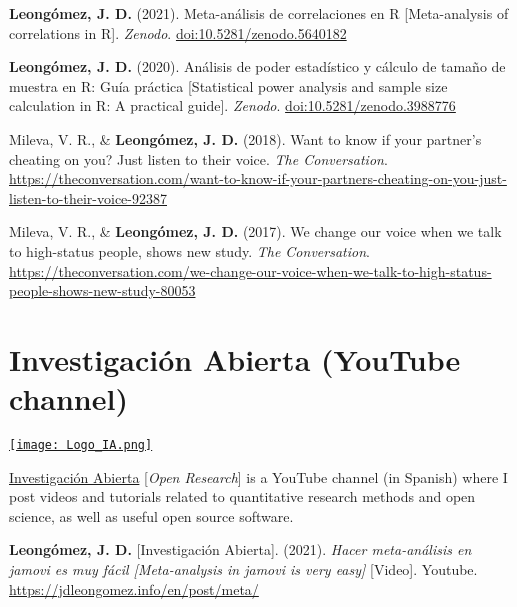 \documentclass[11pt,a4paper,]{awesome-cv}
\begin{document}
\begingroup
\setlength{\parindent}{-0.5in}
\setlength{\leftskip}{0.5in}

\textbf{Leongómez, J. D.} (2021). Meta-análisis de correlaciones en R
{[}Meta-analysis of correlations in R{]}. \emph{Zenodo}.
\url{doi:10.5281/zenodo.5640182}

\textbf{Leongómez, J. D.} (2020). Análisis de poder estadístico y
cálculo de tamaño de muestra en R: Guía práctica {[}Statistical power
analysis and sample size calculation in R: A practical guide{]}.
\emph{Zenodo}. \url{doi:10.5281/zenodo.3988776}

Mileva, V. R., \& \textbf{Leongómez, J. D.} (2018). Want to know if your
partner's cheating on you? Just listen to their voice. \emph{The
Conversation}.
\url{https://theconversation.com/want-to-know-if-your-partners-cheating-on-you-just-listen-to-their-voice-92387}

Mileva, V. R., \& \textbf{Leongómez, J. D.} (2017). We change our voice
when we talk to high-status people, shows new study. \emph{The
Conversation}.
\url{https://theconversation.com/we-change-our-voice-when-we-talk-to-high-status-people-shows-new-study-80053}

\endgroup

\hypertarget{investigaciuxf3n-abierta-youtube-channel}{%
\section{Investigación Abierta (YouTube
channel)}\label{investigaciuxf3n-abierta-youtube-channel}}

\begin{minipage}[c]{0.15\linewidth}
\href{https://www.youtube.com/@InvestigacionAbierta}{\texttt{[image: Logo\_IA.png]}}
\end{minipage} \begin{minipage}[c]{0.85\linewidth}
\textcolor{red}{\faYoutubePlay} \href{https://www.youtube.com/@InvestigacionAbierta}{Investigación Abierta} [\textit{Open Research}] is a YouTube channel (in Spanish) where I post videos and tutorials related to quantitative research methods and open science, as well as useful open source software.
\end{minipage}

\begingroup
\setlength{\parindent}{-0.5in}
\setlength{\leftskip}{0.5in}

\textbf{Leongómez, J. D.} {[}Investigación Abierta{]}. (2021).
\emph{Hacer meta-análisis en jamovi es muy fácil {[}Meta-analysis in
jamovi is very easy{]}} {[}Video{]}. Youtube.
\url{https://jdleongomez.info/en/post/meta/}
\end{document}
